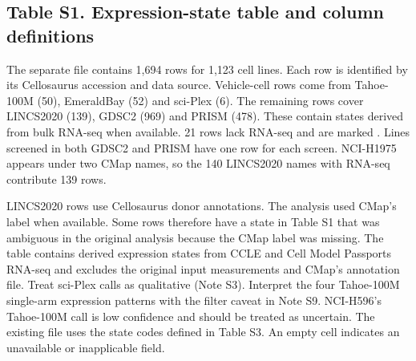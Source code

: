 \documentclass[
  11pt,
  letterpaper,
]{article}
\begin{document}
\subsection{Table S1. Expression-state table and column
definitions}\label{table-s1.-expression-state-table-and-column-definitions}

The separate file  contains 1,694 rows
for 1,123 cell lines. Each row is identified by its Cellosaurus
accession and data source. Vehicle-cell rows come from Tahoe-100M (50),
EmeraldBay (52) and sci-Plex (6). The remaining rows cover LINCS2020
(139), GDSC2 (969) and PRISM (478). These contain states derived from
bulk RNA-seq when available. 21 rows lack RNA-seq and are marked
. Lines screened in both GDSC2 and PRISM have one row
for each screen. NCI-H1975 appears under two CMap names, so the 140
LINCS2020 names with RNA-seq contribute 139 rows.

LINCS2020 rows use Cellosaurus donor annotations. The analysis used
CMap's label when available. Some rows therefore have a state in Table
S1 that was ambiguous in the original analysis because the CMap label
was missing. The table contains derived expression states from CCLE and
Cell Model Passports RNA-seq and excludes the original input
measurements and CMap's annotation file. Treat sci-Plex calls as
qualitative (Note S3). Interpret the four Tahoe-100M single-arm
expression patterns with the filter caveat in Note S9. NCI-H596's
Tahoe-100M call is low confidence and should be treated as uncertain.
The existing file uses the state codes defined in Table S3. An empty
cell indicates an unavailable or inapplicable field.
\end{document}
